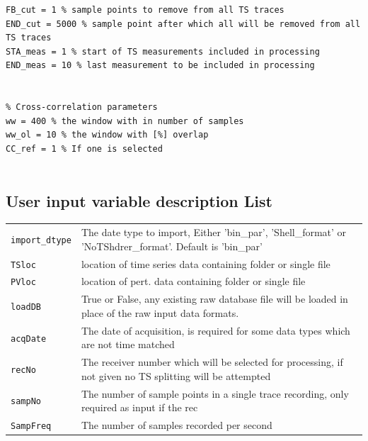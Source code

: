 \documentclass{article}
\begin{document}
\begin{lstlisting}[basicstyle=\small]
% input file for python based CWI processing
FB_cut = 1 % sample points to remove from all TS traces
END_cut = 5000 % sample point after which all will be removed from all TS traces
STA_meas = 1 % start of TS measurements included in processing
END_meas = 10 % last measurement to be included in processing


% Cross-correlation parameters
ww = 400 % the window with in number of samples
ww_ol = 10 % the window with [%] overlap
CC_ref = 1 % If one is selected 


\end{lstlisting}


\subsection{User input variable description List}
\begin{tabular}{l|p{120mm}}
\texttt{import\_dtype} & The date type to import, Either 'bin\_par', 'Shell\_format' or 'NoTShdrer\_format'. Default is  'bin\_par'\\
\texttt{TSloc} & location of time series data containing folder or single file\\
\texttt{PVloc} & location of pert. data containing folder or single file\\
\texttt{loadDB} & True or False, any existing raw database file will be loaded in place of the raw input data formats.\\
\texttt{acqDate} & The date of acquisition, is required for some data types which are not time matched \\
\texttt{recNo} & The receiver number which will be selected for processing, if not given no TS splitting will be attempted\\
\texttt{sampNo} & The number of sample points in a single trace recording, only required as input if the rec\\
\texttt{SampFreq} & The number of samples recorded per second\\
\end{tabular}
\newline
\end{document}
